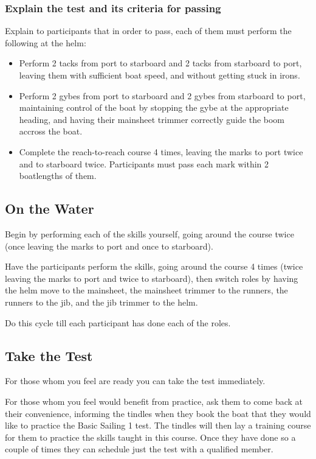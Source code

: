 \documentclass[12pt]{scrartcl}
\begin{document}
\subsubsection{Explain the test and its criteria for passing} \label{subsubsec:test}

Explain to participants that in order to pass, each of them must perform the following at the helm:

\begin{itemize}
		\item Perform 2 tacks from port to starboard and 2 tacks from starboard to port, leaving them with sufficient boat speed, and without getting stuck in irons.
		\item Perform 2 gybes from port to starboard and 2 gybes from starboard to port, maintaining control of the boat by stopping the gybe at the appropriate heading, and having their mainsheet trimmer correctly guide the boom accross the boat.
		\item Complete the reach-to-reach course 4 times, leaving the marks to port twice and to starboard twice. Participants must pass each mark within 2 boatlengths of them.
\end{itemize}

\subsection{On the Water} \label{subsec:on the water}

Begin by performing each of the skills yourself, going around the course twice (once leaving the marks to port and once to starboard).

Have the participants perform the skills, going around the course 4 times (twice leaving the marks to port and twice to starboard), then switch roles by having the helm move to the mainsheet, the mainsheet trimmer to the runners, the runners to the jib, and the jib trimmer to the helm.

Do this cycle till each participant has done each of the roles.

\subsection{Take the Test} \label{subsec:take the test}

For those whom you feel are ready you can take the test immediately.

For those whom you feel would benefit from practice, ask them to come back at their convenience, informing the tindles when they book the boat that they would like to practice the Basic Sailing 1 test. The tindles will then lay a training course for them to practice the skills taught in this course. Once they have done so a couple of times they can schedule just the test with a qualified member.
\end{document}
